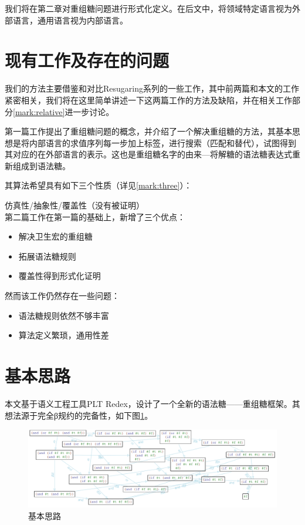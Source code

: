 我们将在第二章对重组糖问题进行形式化定义。在后文中，将领域特定语言视为外部语言，通用语言视为内部语言。

\section{现有工作及存在的问题}
我们的方法主要借鉴和对比Resugaring系列\cite{resugaring}\cite{hygienic}\cite{resugaringscpoe}\cite{resugaringtype}的一些工作，其中前两篇和本文的工作紧密相关，我们将在这里简单讲述一下这两篇工作的方法及缺陷，并在相关工作部分\ref{mark:relative}进一步讨论。

第一篇工作提出了重组糖问题的概念，并介绍了一个解决重组糖的方法，其基本思想是将内部语言的求值序列每一步加上标签，进行搜索（匹配和替代），试图得到其对应的在外部语言的表示。这也是重组糖名字的由来---将解糖的语法糖表达式重新组成到语法糖。

其算法希望具有如下三个性质（详见\ref{mark:three}）：

仿真性/抽象性/覆盖性（没有被证明）
\\[12pt]

第二篇工作在第一篇的基础上，新增了三个优点：

\begin{itemize}
	\item 解决卫生宏的重组糖
	\item 拓展语法糖规则
	\item 覆盖性得到形式化证明
\end{itemize}

然而该工作仍然存在一些问题：
\begin{itemize}
	\item 语法糖规则依然不够丰富
	\item 算法定义繁琐，通用性差
\end{itemize}

\section{基本思路}

本文基于语义工程工具PLT Redex\cite{SEwPR}，设计了一个全新的语法糖——重组糖框架。其想法源于完全β规约的完备性，如下图\ref{fig:base}。

\begin{figure}[ht]
	\centering
	\includegraphics[width=12cm]{images/chapter1/example.png}
	\caption{基本思路}
	\label{fig:base}
\end{figure}

